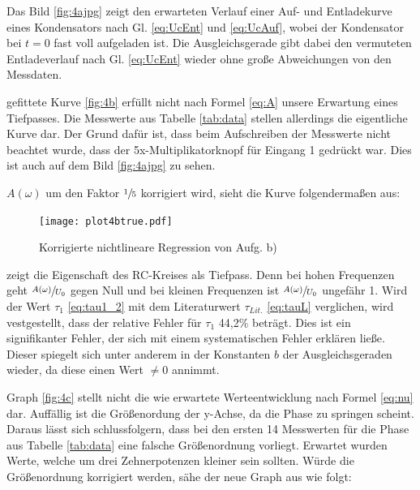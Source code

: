 
Das Bild \ref{fig:4ajpg} zeigt den erwarteten Verlauf einer Auf- und Entladekurve
eines Kondensators nach Gl. \eqref{eq:UcEnt} und \eqref{eq:UcAuf}, wobei der Kondensator bei $t=0$ fast voll aufgeladen ist.
Die Ausgleichsgerade gibt dabei den vermuteten Entladeverlauf nach Gl. \eqref{eq:UcEnt} wieder 
ohne große Abweichungen von den Messdaten.


 \justifying gefittete Kurve \ref{fig:4b} erfüllt nicht nach Formel \eqref{eq:A} unsere Erwartung eines Tiefpasses. 
Die Messwerte aus Tabelle \ref{tab:data} stellen allerdings die eigentliche Kurve
dar. Der Grund dafür ist, dass beim Aufschreiben der Messwerte nicht beachtet wurde,
dass der 5x-Multiplikatorknopf für Eingang 1 gedrückt war. Dies ist auch auf dem Bild \ref{fig:4ajpg}
zu sehen.

\newpage
{} \justifying $A(\omega)$ um den Faktor $\sfrac{1}{5}$ korrigiert wird, sieht die Kurve 
folgendermaßen aus:

\begin{figure}[H]
    \texttt{[image: plot4btrue.pdf]}
    \centering
    \caption{Korrigierte nichtlineare Regression von Aufg. b)}
    \label{fig:4btrue}
\end{figure}


 \justifying zeigt die Eigenschaft des RC-Kreises als Tiefpass.
Denn bei hohen Frequenzen geht $\sfrac{A(\omega)}{U_0}$ gegen Null und bei kleinen
Frequenzen ist $\sfrac{A(\omega)}{U_0}$ ungefähr 1.
Wird der Wert $\tau_1$ \eqref{eq:tau1_2} mit dem Literaturwert $\tau_{Lit.}$
\eqref{eq:tauL} verglichen, wird vestgestellt, dass der relative Fehler für $\tau_1$ 
44,2\% beträgt. Dies ist ein signifikanter Fehler, der sich mit einem  
systematischen Fehler erklären ließe. Dieser spiegelt sich unter anderem 
in der Konstanten $b$ der Ausgleichsgeraden wieder, da diese einen Wert $\ne 0$ 
annimmt. 


 \justifying Graph \ref{fig:4c} stellt nicht die wie erwartete Werteentwicklung nach Formel
\eqref{eq:nu} dar. Auffällig ist die Größenordung der y-Achse, da die Phase zu
springen scheint. Daraus lässt sich schlussfolgern, dass bei den ersten 14 Messwerten
für die Phase aus Tabelle \ref{tab:data} eine falsche Größenordnung vorliegt.
Erwartet wurden Werte, welche um drei Zehnerpotenzen kleiner sein sollten. 
Würde die Größenordnung korrigiert werden, sähe der neue Graph aus wie folgt:

